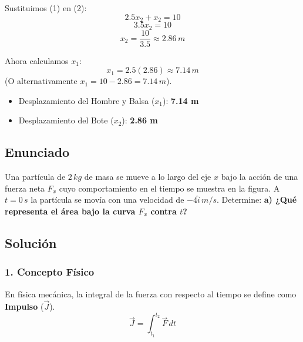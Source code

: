 \documentclass[12pt, a4paper]{article}
\begin{document}
Sustituimos (1) en (2):
$$ 2.5 x_2 + x_2 = 10 $$
$$ 3.5 x_2 = 10 $$
$$ x_2 = \frac{10}{3.5} \approx 2.86 \, \si{m} $$

Ahora calculamos $x_1$:
$$ x_1 = 2.5 (2.86) \approx 7.14 \, \si{m} $$
(O alternativamente $x_1 = 10 - 2.86 = 7.14 \, \si{m}$).

\begin{tcolorbox}[colback=green!5!white, colframe=green!50!black, title=Respuesta Final]
\begin{itemize}
    \item Desplazamiento del Hombre y Balsa ($x_1$): \textbf{7.14 m}
    \item Desplazamiento del Bote ($x_2$): \textbf{2.86 m}
\end{itemize}
\end{tcolorbox}

\newpage

\subsection*{Enunciado}
Una partícula de $2 \, \si{kg}$ de masa se mueve a lo largo del eje $x$ bajo la acción de una fuerza neta $F_x$ cuyo comportamiento en el tiempo se muestra en la figura. A $t=0 \, \si{s}$ la partícula se movía con una velocidad de $-4 \hat{i} \, \si{m/s}$. 
Determine: \textbf{a) ¿Qué representa el área bajo la curva $F_x$ contra $t$?}

\begin{center}
\end{center}

\subsection*{Solución}

\subsubsection*{1. Concepto Físico}
En física mecánica, la integral de la fuerza con respecto al tiempo se define como \textbf{Impulso} ($\vec{J}$).
$$ \vec{J} = \int_{t_1}^{t_2} \vec{F} \, dt $$
\end{document}
